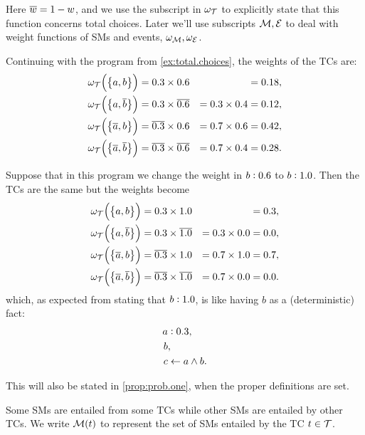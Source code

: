 \documentclass[x11names]{tlp}
\begin{document}
Here $\overline{w} = 1 - w$, and we use the subscript in $\omega_{{\mathcal{T}}}$ to explicitly state that this function concerns total choices.
Later we'll use subscripts ${\mathcal{M}}, {\mathcal{E}}$ to deal with weight functions of \aclp{SM} and events, $\omega_{{\mathcal{M}}}, \omega_{{\mathcal{E}}}$.

\ifExamples
	\begin{example}%
		\label{ex:weight.total.choices}
		\em

		Continuing with the program from \cref{ex:total.choices}, the weights of the \aclp{TC} are:
		\begin{equation*}
			\begin{aligned}
				\wgtT\at{\set[1]{a, b}}           & = 0.3 \times 0.6           &                  & = 0.18, %
				\\
				\wgtT\at{\set[1]{a, \co{b}}}      & = 0.3 \times \co{0.6}      & = 0.3 \times 0.4 & = 0.12, %
				\\
				\wgtT\at{\set[1]{\co{a}, b}}      & = \co{0.3} \times 0.6      & = 0.7 \times 0.6 & = 0.42, %
				\\
				\wgtT\at{\set[1]{\co{a}, \co{b}}} & = \co{0.3} \times \co{0.6} & = 0.7 \times 0.4 & = 0.28.
			\end{aligned}
		\end{equation*}

		Suppose that in this program we change the weight in $b:0.6$
		to $b:1.0$.
		Then the \aclp{TC} are the same but the weights become
		\begin{equation*}
			\begin{aligned}
				\wgtT\at{\set[1]{a, b}}           & = 0.3 \times 1.0           &                  & = 0.3, %
				\\
				\wgtT\at{\set[1]{a, \co{b}}}      & = 0.3 \times \co{1.0}      & = 0.3 \times 0.0 & = 0.0, %
				\\
				\wgtT\at{\set[1]{\co{a}, b}}      & = \co{0.3} \times 1.0      & = 0.7 \times 1.0 & = 0.7, %
				\\
				\wgtT\at{\set[1]{\co{a}, \co{b}}} & = \co{0.3} \times \co{1.0} & = 0.7 \times 0.0 & = 0.0.
			\end{aligned}
		\end{equation*}
		which, as expected from stating that $b:1.0$, is like having $b$ as a (deterministic) fact:
		\begin{equation*}
			\begin{split}
				\weightfact{a & }{0.3},             %
				\\
				b           & ,                   %
				\\
				c           & \clause a \wedge b.
			\end{split}
		\end{equation*}

		This will also be stated in \cref{prop:prob.one}, when the proper definitions
		are set.
	\end{example}
\fi Some \aclp{SM} are entailed from some \aclp{TC} while other \acp{SM} are entailed by other \acp{TC}.
We write $\tcgen{t}$ to represent the set of \aclp{SM} entailed by the \acl{TC} $t \in {\mathcal{T}}$.
\end{document}

